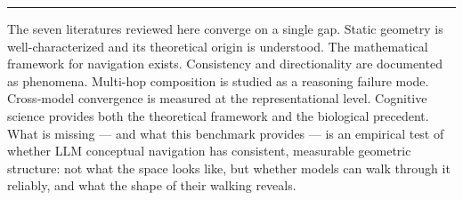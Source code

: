 \begin{center}\rule{0.5\linewidth}{0.5pt}\end{center}

The seven literatures reviewed here converge on a single gap. Static geometry is well-characterized and its theoretical origin is understood. The mathematical framework for navigation exists. Consistency and directionality are documented as phenomena. Multi-hop composition is studied as a reasoning failure mode. Cross-model convergence is measured at the representational level. Cognitive science provides both the theoretical framework and the biological precedent. What is missing --- and what this benchmark provides --- is an empirical test of whether LLM conceptual navigation has consistent, measurable geometric structure: not what the space looks like, but whether models can walk through it reliably, and what the shape of their walking reveals.
